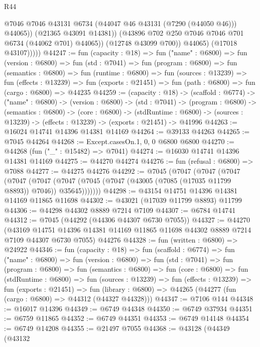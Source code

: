 \begin{lexlean}{R44}
\begin{coremodule}
{                        @7046
                        @7046
                        @43131
                        @6734
                        (@44047 @46 @43131 (@7290 (@44050 @46)))
                        @44065))
                    (@21365 @43091 @14381))
                  (@43896 @702 @250 @7046 @7046 @701 @6734 (@44062 @701) @44065))
                (@12748 @43099 @700))
              @44065)
            (@17018 @43107)))))
@44247 := fun (capacity : @18) =>
  fun ("name" : @6800) =>
  fun (version : @6800) =>
  fun (std : @7041) =>
  fun (program : @6800) =>
  fun (semantics : @6800) =>
  fun (runtime : @6800) =>
  fun (sources : @13239) =>
  fun (effects : @13239) =>
  fun (exports : @21451) => fun (path : @6800) => fun (cargo : @6800) => @44235
@44259 := (capacity : @18) ->
  (scaffold : @6774) ->
  ("name" : @6800) ->
  (version : @6800) ->
  (std : @7041) ->
  (program : @6800) ->
  (semantics : @6800) ->
  (core : @6800) ->
  (stdRuntime : @6800) -> (sources : @13239) -> (effects : @13239) -> (exports : @21451) -> @41996
@44263 := @16024 @14741 @14396 @14381 @14169
@44264 := @39133 @44263
@44265 := @7045 @44264
@44268 := Except.casesOn.{1, 0, 0} @6800 @6800
@44270 := @44268 (fun ("_" : @15482) => @7041)
@44274 := @16030 @14741 @14396 @14381 @14169
@44275 := @44270 @44274
@44276 := fun (refusal : @6800) => @7088
@44277 := @44275 @44276
@44292 := @7045
    (@7047
      (@7047
        (@7047
          (@7047
            (@7047 (@7047 (@7045 (@7047 (@43005 (@7085 (@17035 @11799 @8893)) @7046)) @35645)))))))
@44298 := @43154 @14751 @14396 @14381 @14169 @11865 @11698
@44302 := @43021 (@17039 @11799 @8893) @11799
@44306 := @44298 @44302 @8889 @7214 @7109
@44307 := @6784 @14741
@44312 := @7045 (@44292 (@44306 @44307 @6730 @7055))
@44327 := @44270
    (@43169 @14751 @14396 @14381 @14169 @11865 @11698 @44302 @8889 @7214 @7109 @44307 @6730 @7055)
    @44276
@44328 := fun (written : @6800) => @24922
@44346 := fun (capacity : @18) =>
  fun (scaffold : @6774) =>
  fun ("name" : @6800) =>
  fun (version : @6800) =>
  fun (std : @7041) =>
  fun (program : @6800) =>
  fun (semantics : @6800) =>
  fun (core : @6800) =>
  fun (stdRuntime : @6800) =>
  fun (sources : @13239) =>
  fun (effects : @13239) =>
  fun (exports : @21451) =>
  fun (library : @6800) => @44265 (@44277 (fun (cargo : @6800) => @44312 (@44327 @44328)))
@44347 := @7106 @144
@44348 := @16017 @14396
@44349 := @6749 @44348
@44350 := @6749 @37934
@44351 := @6759 @11865
@44352 := @6749 @44351
@44353 := @6749 @14148
@44354 := @6749 @14208
@44355 := @21497 @7055
@44368 := @43128
    (@44349
      (@43132
}
\end{coremodule}
\end{lexlean}
